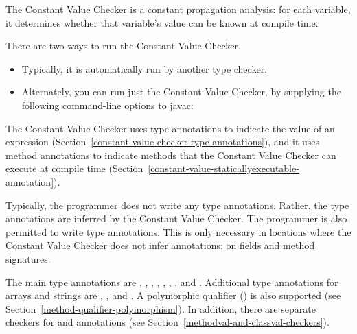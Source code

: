 \htmlhr
{}

The Constant Value Checker is a constant propagation analysis: for
each variable, it determines whether that variable's value can be
known at compile time.

There are two ways to run the Constant Value Checker.
\begin{itemize}
\item
Typically, it is automatically run by another type checker.
\item
Alternately, you can run just the Constant Value Checker, by
supplying the following command-line options to javac:
\end{itemize}



The Constant Value Checker uses type annotations to indicate the value of
an expression (Section~\ref{constant-value-checker-type-annotations}), and
it uses method annotations to indicate methods that the Constant Value
Checker can execute at compile time
(Section~\ref{constant-value-staticallyexecutable-annotation}).



Typically, the programmer does not write any type annotations.  Rather, the
type annotations are inferred by the Constant Value Checker.
The programmer is also permitted to write type annotations.  This is only necessary in
locations where the Constant Value Checker does not infer annotations:  on fields
and method signatures.

The main type annotations are
,
,
,
,
,
,
,
and .
Additional type annotations for arrays and strings are
,
,
and .
A polymorphic qualifier ()
is also supported (see Section~\ref{method-qualifier-polymorphism}).
In addition, there are separate checkers for
 and
 annotations
(see Section~\ref{methodval-and-classval-checkers}).

